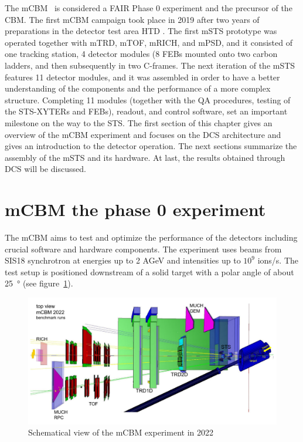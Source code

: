 The mCBM~\cite{mCBM} is considered a FAIR Phase 0 experiment and the precursor of the \gls{CBM}. The first mCBM campaign took place in 2019 after two years of preparations in the detector test area HTD \cite{progress_report_2017_sturm}. The first \gls{mSTS} prototype was operated together with mTRD, mTOF, mRICH, and mPSD, and it consisted of one tracking station, 4 detector modules (8 \gls{FEB}s mounted onto two carbon ladders, and then subsequently in two C-frames. The next iteration of the \gls{mSTS} features 11 detector modules, and it was assembled in order to have a better understanding of the components and the performance of a more complex structure. Completing 11 modules (together with the QA procedures, testing of the STS-XYTERs and \gls{FEB}s), readout, and control software, set an important milestone on the way to the STS. The first section of this chapter gives an overview of the mCBM experiment and focuses on the DCS architecture and gives an introduction to the detector operation. The next sections summarize the assembly of the \gls{mSTS} and its hardware. At last, the results obtained through DCS will be discussed. 

\section{mCBM the phase 0 experiment}
The mCBM aims to test and optimize the performance of the detectors including crucial software and hardware components. The experiment uses beams from SIS18 synchrotron at energies up to 2 AGeV and intensities up to $10^{9}$ ions/s. The test setup is positioned downstream of a solid target with a polar angle of about \SI{25}{\degree} (see figure~\ref{fig_mcbm}).

\begin{figure}[!h]
\centering
\includegraphics[width=0.7\columnwidth]{Chapter5/DCS/images/mcbm_2021_setup.png}
\caption{Schematical view of the mCBM experiment in 2022}
\label{fig_mcbm}
\end{figure}

